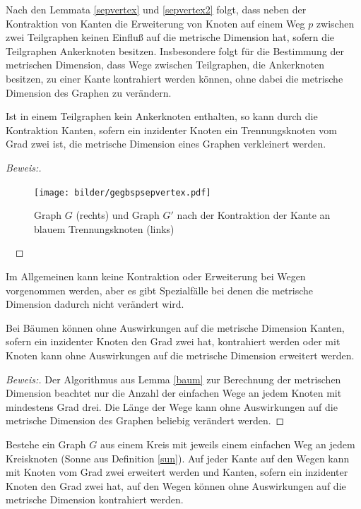 \begin{bem}
Nach den Lemmata \ref{sepvertex} und \ref{sepvertex2} folgt, dass neben der Kontraktion von Kanten die Erweiterung von Knoten auf einem Weg $p$ zwischen zwei Teilgraphen keinen Einfluß auf die metrische Dimension hat, sofern die Teilgraphen Ankerknoten besitzen. Insbesondere folgt für die Bestimmung der metrischen Dimension, dass Wege zwischen Teilgraphen, die Ankerknoten besitzen, zu einer Kante kontrahiert werden können, ohne dabei die metrische Dimension des Graphen zu verändern.
\end{bem}
\begin{lem}
Ist in einem Teilgraphen kein Ankerknoten enthalten, so kann durch die Kontraktion Kanten, sofern ein inzidenter Knoten ein Trennungsknoten vom Grad zwei ist, die metrische Dimension eines Graphen verkleinert werden.
\end{lem}
\begin{proof}[Beweis:] ~ \newline
\vspace{-7mm}
\begin{figure}[!h]
\centering
\texttt{[image: bilder/gegbspsepvertex.pdf]}
\caption{Graph $G$ (rechts) und Graph $G'$ nach der Kontraktion der Kante an blauem Trennungsknoten (links)}
\end{figure} 
\vspace{-8mm}
~\linebreak
\end{proof}
Im Allgemeinen kann keine Kontraktion oder Erweiterung bei Wegen vorgenommen werden, aber es gibt Spezialfälle bei denen die metrische Dimension dadurch nicht verändert wird.
\begin{lem}
Bei Bäumen können ohne Auswirkungen auf die metrische Dimension Kanten, sofern ein inzidenter Knoten den Grad zwei hat, kontrahiert werden oder mit Knoten kann ohne Auswirkungen auf die metrische Dimension erweitert werden.
\end{lem}
\begin{proof}[Beweis:]
Der Algorithmus aus Lemma \ref{baum} zur Berechnung der metrischen Dimension beachtet nur die Anzahl der einfachen Wege an jedem Knoten mit mindestens Grad drei. Die Länge der Wege kann ohne Auswirkungen auf die metrische Dimension des Graphen beliebig verändert werden.
\end{proof}
\begin{lem}
\label{sonneerweiterung}
Bestehe ein Graph $G$ aus einem Kreis mit jeweils einem einfachen Weg an jedem Kreisknoten (Sonne aus Definition \ref{sun}). Auf jeder Kante auf den Wegen kann mit Knoten vom Grad zwei erweitert werden und Kanten, sofern ein inzidenter Knoten den Grad zwei hat, auf den Wegen können ohne Auswirkungen auf die metrische Dimension kontrahiert werden.
\end{lem}

